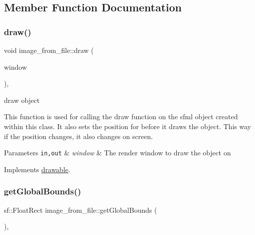\subsection{Member Function Documentation}
\mbox{\label{classimage__from__file_a26eae6c872ca9033cacc3f6eb2762983}} 
\subsubsection{\texorpdfstring{draw()}{draw()}}
{\footnotesize\ttfamily void image\+\_\+from\+\_\+file\+::draw (\begin{DoxyParamCaption}\item[{sf\+::\+Render\+Window \&}]{window }\end{DoxyParamCaption})\hspace{0.3cm}{\ttfamily [override]}, {\ttfamily [virtual]}}



draw object 

This function is used for calling the draw function on the sfml object created within this class. It also sets the position for before it draws the object. This way if the position changes, it also changes on screen.


\begin{DoxyParams}[1]{Parameters}
\mbox{\tt in,out}  & {\em window} & The render window to draw the object on \\
\hline
\end{DoxyParams}


Implements \hyperlink{classdrawable_a4e49e2c1121704c83ce24c5f48dd910f}{drawable}.

\mbox{\label{classimage__from__file_a971a591f906fa5c6e85b4e32cfc3d6a0}} 
\subsubsection{\texorpdfstring{get\+Global\+Bounds()}{getGlobalBounds()}}
{\footnotesize\ttfamily sf\+::\+Float\+Rect image\+\_\+from\+\_\+file\+::get\+Global\+Bounds (\begin{DoxyParamCaption}{ }\end{DoxyParamCaption})\hspace{0.3cm}{\ttfamily [override]}, {\ttfamily [virtual]}}



